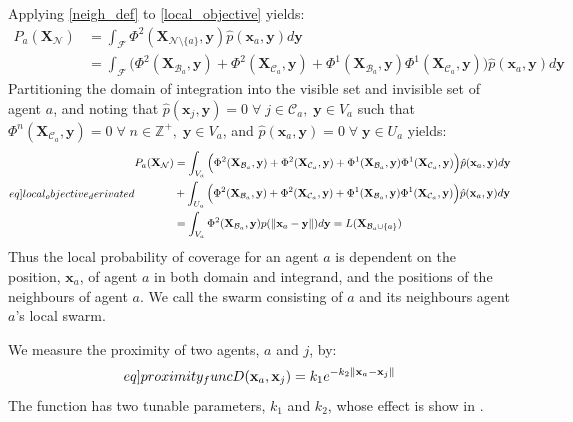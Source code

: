 Applying \eqref{neigh_def} to \eqref{local_objective} yields:
\begin{equation}
  \begin{split}
    P_{a}(\mathbf{X}_{\mathcal{N}}) &= \int_{\mathcal{F}}\Phi^{2}(\mathbf{X}_{\mathcal{N}\setminus\{a\}}, \mathbf{y})\hat{p}(\mathbf{x}_{a}, \mathbf{y})d\mathbf{y}\\
    &= \int_{\mathcal{F}}\Big(\Phi^{2}(\mathbf{X}_{\mathcal{B}_{a}}, \mathbf{y}) + \Phi^{2}(\mathbf{X}_{\mathcal{C}_{a}}, \mathbf{y}) + \Phi^{1}(\mathbf{X}_{\mathcal{B}_{a}}, \mathbf{y})\Phi^{1}(\mathbf{X}_{\mathcal{C}_{a}}, \mathbf{y})\Big)\hat{p}(\mathbf{x}_{a}, \mathbf{y})d\mathbf{y}
  \end{split}
\end{equation}
Partitioning the domain of integration into the visible set and invisible set of agent $a$, and noting that $\hat{p}(\mathbf{x}_{j}, \mathbf{y}) = 0\;\forall\;j\in\mathcal{C}_{a},\;\mathbf{y}\in V_{a}$ such that
$\Phi^{n}(\mathbf{X}_{\mathcal{C}_{a}}, \mathbf{y}) = 0\;\forall\;n\in\mathbb{Z}^{+},\;\mathbf{y}\in V_{a}$, and $\hat{p}(\mathbf{x}_{a}, \mathbf{y}) = 0\;\forall\;\mathbf{y}\in U_{a}$ yields:
\begin{equation}\label[eq]{local_objective_derivated}
  \begin{split}
    P_{a}(\mathbf{X}_{\mathcal{N}}) &= \int_{V_{a}}\Big(\Phi^{2}(\mathbf{X}_{\mathcal{B}_{a}}, \mathbf{y}) + \Phi^{2}(\mathbf{X}_{\mathcal{C}_{a}}, \mathbf{y}) + \Phi^{1}(\mathbf{X}_{\mathcal{B}_{a}}, \mathbf{y})\Phi^{1}(\mathbf{X}_{\mathcal{C}_{a}}, \mathbf{y})\Big)\hat{p}(\mathbf{x}_{a}, \mathbf{y})d\mathbf{y}\\
    &+ \int_{U_{a}}\Big(\Phi^{2}(\mathbf{X}_{\mathcal{B}_{a}}, \mathbf{y}) + \Phi^{2}(\mathbf{X}_{\mathcal{C}_{a}}, \mathbf{y}) + \Phi^{1}(\mathbf{X}_{\mathcal{B}_{a}}, \mathbf{y})\Phi^{1}(\mathbf{X}_{\mathcal{C}_{a}}, \mathbf{y})\Big)\hat{p}(\mathbf{x}_{a}, \mathbf{y})d\mathbf{y}\\
    &= \int_{V_{a}}\Phi^{2}(\mathbf{X}_{\mathcal{B}_{a}}, \mathbf{y})p(\norm{\mathbf{x}_{a}-\mathbf{y}})d\mathbf{y} = L(\mathbf{X}_{\mathcal{B}_{a}\cup\{a\}})
  \end{split}
\end{equation}
Thus the local probability of coverage for an agent $a$ is dependent on the position, $\mathbf{x}_{a}$, of agent $a$ in both domain and integrand, and the positions of the neighbours of agent $a$.
We call the swarm consisting of $a$ and its neighbours agent $a$'s local swarm.

We measure the proximity of two agents, $a$ and $j$, by:
\begin{equation}\label[eq]{proximity_func}
  D(\mathbf{x}_{a}, \mathbf{x}_{j}) = k_{1}e^{-k_{2}\norm{\mathbf{x}_{a} - \mathbf{x}_{j}}}
\end{equation}
The function has two tunable parameters, $k_{1}$ and $k_{2}$, whose effect is show in .

